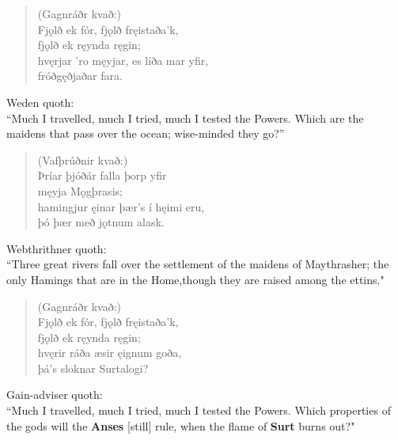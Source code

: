 \begin{verse}
(Gagnráðr kvað:) \\%
\bva Fjǫlð ek fór, \hld fjǫlð fręistaða'k, \\%
\ind fjǫlð ek ręynda ręgin; \\%
hvęrjar 'ro męyjar, \hld es líða mar yfir, \\%
\ind fróðgęðjaðar fara.\\%
\end{verse}

\bvb Weden quoth: \\ “Much I travelled, much I tried, much I tested the Powers. Which are the maidens that pass over the ocean; wise-minded they go?” \\

\begin{verse}
(Vafþrúðnir kvað:) \\%
\bva Þríar þjóðár \hld falla þorp yfir \\%
\ind męyja Mǫgþrasis; \\%
hamingjur ęinar \hld þær’s í hęimi eru, \\%
\ind þó þær með jǫtnum alask.\\%
\end{verse}

\bvb Webthrithner quoth: \\ “Three great rivers fall over the settlement of the maidens of Maythrasher; the only Hamings that are in the Home,\footnotemark[1] though they are raised among the ettins\footnotemark[2]." \\

\begin{verse}
(Gagnráðr kvað:) \\%
\bva Fjǫlð ek fór, \hld fjǫlð fręistaða'k, \\%
\ind fjǫlð ek ręynda ręgin; \\%
hvęrir ráða æsir \hld ęignum goða, \\%
\ind þá's sloknar Surtalogi?\\%
\end{verse}

\bvb Gain-adviser quoth: \\ “Much I travelled, much I tried, much I tested the Powers. Which properties of the gods will the \textbf{Anses} [still] rule\footnotemark[105], when the flame of \textbf{Surt} burns out?" \\

